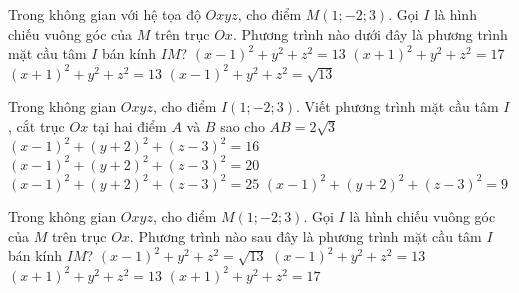 \begin{ex}%
	Trong không gian với hệ tọa độ $Oxyz$, cho điểm $M(1;-2;3)$. Gọi $I$ là hình chiếu vuông góc của $M$ trên trục $Ox$. Phương trình nào dưới đây là phương trình mặt cầu tâm $I$ bán kính $IM$?
	\choice
	{\True $(x-1)^2+y^2+z^2=13$}
	{$(x+1)^2+y^2+z^2=17$}
	{$(x+1)^2+y^2+z^2=13$}
	{$(x-1)^2+y^2+z^2=\sqrt{13}$}
\end{ex}

\begin{ex}%
	Trong không gian $Oxyz$, cho điểm $I(1;-2;3)$. Viết phương trình mặt cầu tâm $I$, cắt trục $Ox$ tại hai điểm $A$ và $B$ sao cho $AB=2\sqrt{3}$
	\choice
	{\True $(x-1)^2+(y+2)^2+(z-3)^2=16$}
	{$(x-1)^2+(y+2)^2+(z-3)^2=20$}
	{$(x-1)^2+(y+2)^2+(z-3)^2=25$}
	{$(x-1)^2+(y+2)^2+(z-3)^2=9$}
\end{ex}

\begin{ex}%
	Trong không gian $Oxyz$, cho điểm $M(1;-2;3)$. Gọi $I$ là hình chiếu vuông góc của $M$ trên trục $Ox$. Phương trình nào sau đây là phương trình mặt cầu tâm $I$ bán kính $IM$?
	\choice
	{$(x-1)^2+y^2+z^2=\sqrt{13}$}
	{\True $(x-1)^2+y^2+z^2=13$}
	{$(x+1)^2+y^2+z^2=13$}
	{$(x+1)^2+y^2+z^2=17$}
\end{ex}

